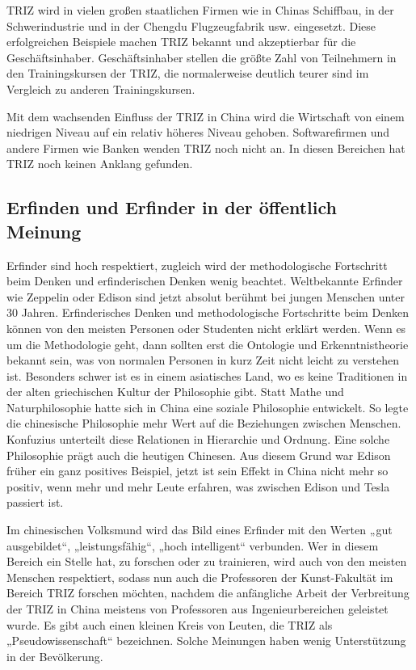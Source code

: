 \documentclass[11pt,a4paper]{article}
\begin{document}
TRIZ wird in vielen großen staatlichen Firmen wie in Chinas Schiffbau, in der
Schwerindustrie und in der Chengdu Flugzeugfabrik usw. eingesetzt.  Diese
erfolgreichen Beispiele machen TRIZ bekannt und akzeptierbar für die
Geschäftsinhaber.  Geschäftsinhaber stellen die größte Zahl von Teilnehmern in
den Trainingskursen der TRIZ, die normalerweise deutlich teurer sind im
Vergleich zu anderen Trainingskursen.

Mit dem wachsenden Einfluss der TRIZ in China wird die Wirtschaft von einem
niedrigen Niveau auf ein relativ höheres Niveau gehoben.  Softwarefirmen und
andere Firmen wie Banken wenden TRIZ noch nicht an. In diesen Bereichen hat
TRIZ noch keinen Anklang gefunden.

\subsection{Erfinden und Erfinder in der öffentlich Meinung}

Erfinder sind hoch respektiert, zugleich wird der methodologische Fortschritt
beim Denken und erfinderischen Denken wenig beachtet. Weltbekannte Erfinder
wie Zeppelin oder Edison sind jetzt absolut berühmt bei jungen Menschen unter
30 Jahren. Erfinderisches Denken und methodologische Fortschritte beim Denken
können von den meisten Personen oder Studenten nicht erklärt werden. Wenn es
um die Methodologie geht, dann sollten erst die Ontologie und
Erkenntnistheorie bekannt sein, was von normalen Personen in kurz Zeit nicht
leicht zu verstehen ist. Besonders schwer ist es in einem asiatisches Land, wo
es keine Traditionen in der alten griechischen Kultur der Philosophie gibt.
Statt Mathe und Naturphilosophie hatte sich in China eine soziale Philosophie
entwickelt. So legte die chinesische Philosophie mehr Wert auf die Beziehungen
zwischen Menschen. Konfuzius unterteilt diese Relationen in Hierarchie und
Ordnung.  Eine solche Philosophie prägt auch die heutigen Chinesen. Aus diesem
Grund war Edison früher ein ganz positives Beispiel, jetzt ist sein Effekt in
China nicht mehr so positiv, wenn mehr und mehr Leute erfahren, was zwischen
Edison und Tesla passiert ist.

Im chinesischen Volksmund wird das Bild eines Erfinder mit den Werten „gut
ausgebildet“, „leistungsfähig“, „hoch intelligent“ verbunden. Wer in diesem
Bereich ein Stelle hat, zu forschen oder zu trainieren, wird auch von den
meisten Menschen respektiert, sodass nun auch die Professoren der
Kunst-Fakultät im Bereich TRIZ forschen möchten, nachdem die anfängliche
Arbeit der Verbreitung der TRIZ in China meistens von Professoren aus
Ingenieurbereichen geleistet wurde. Es gibt auch einen kleinen Kreis von
Leuten, die TRIZ als „Pseudowissenschaft“ bezeichnen.  Solche Meinungen haben
wenig Unterstützung in der Bevölkerung.
\end{document}
